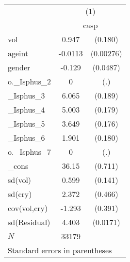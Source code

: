 \begin{tabular}{l*{1}{cc}} \hline\hline
             &\multicolumn{2}{c}{(1)}  \\
             &\multicolumn{2}{c}{casp} \\
\hline
vol          &       0.947&     (0.180)\\
ageint       &     -0.0113&   (0.00276)\\
gender       &      -0.129&    (0.0487)\\
o.\_Isphus\_2  &           0&         (.)\\
\_Isphus\_3    &       6.065&     (0.189)\\
\_Isphus\_4    &       5.003&     (0.179)\\
\_Isphus\_5    &       3.649&     (0.176)\\
\_Isphus\_6    &       1.901&     (0.180)\\
o.\_Isphus\_7  &           0&         (.)\\
\_cons       &       36.15&     (0.711)\\
sd(vol)      &       0.599&     (0.141)\\
sd(cry)      &       2.372&     (0.466)\\
cov(vol,cry) &      -1.293&     (0.391)\\
sd(Residual) &       4.403&    (0.0171)\\
\hline
\(N\)        &       33179&            \\
\hline\hline
\multicolumn{3}{l}{\footnotesize Standard errors in parentheses}\\
\end{tabular}
